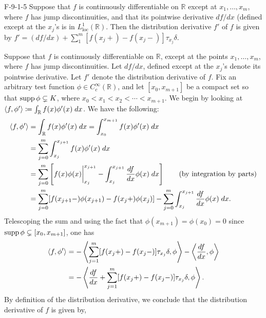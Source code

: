 \documentclass{article}
\begin{document}
	\begin{prb}{F-9-1-5}
		Suppose that $f$ is continuously differentiable on $\mathbb{R}$ except at $x_{1}, \ldots, x_{m}$, where $f$ has jump discontinuities, and that its pointwise derivative $df/dx$ (defined except at the $x_{j}$'s is in $L^{1}_{\text{loc}}(\mathbb{R})$. Then the distribution derivative $f'$ of $f$ is given by $f' = (df/dx) + \sum_{1}^{m}[f(x_{j}+) - f(x_{j}-)]\tau_{x_{j}}\delta$. 
	\end{prb}
	Suppose that $f$ is continuously differentiable on $\mathbb{R}$, except at the points $x_{1}, \ldots, x_{m}$, where $f$ has jump discontinuities. Let $df/dx$, defined except at the $x_{j}$'s denote its pointwise derivative. Let $f'$ denote the distribution derivative of $f$. Fix an arbitrary test function $\phi \in C_{c}^{\infty}(\mathbb{R})$, and let $[x_{0}, x_{m + 1}]$ be a compact set so that $\operatorname{supp}{\phi} \subsetneq K$, where $x_{0} < x_{1} < x_{2} < \dotsm < x_{m + 1}$. We begin by looking at $\braket{f, \phi'} \coloneqq \int_{\mathbb{R}}f(x)\phi'(x)\;dx$. We have the following: 
	\begin{align*}
		\begin{split}
			\braket{f, \phi'} &= \int_{\mathbb{R}}f(x)\phi'(x)\;dx = \int_{x_{0}}^{x_{m + 1}}f(x)\phi'(x)\;dx \\
			&= \sum_{j = 0}^{m}\int_{x_{j}}^{x_{j + 1}}f(x)\phi'(x)\;dx \\
			&= \sum_{j = 0}^{m}\left[f(x)\phi(x)\bigg|_{x_{j}}^{x_{j + 1}} - \int_{x_{j}}^{x_{j + 1}}\frac{df}{dx}\phi(x)\;dx\right] \qquad (\text{by integration by parts}) \\
			&= \sum_{j = 0}^{m}[f(x_{j+1}-)\phi(x_{j + 1}) - f(x_{j}+)\phi(x_{j})] - \sum_{j = 0}^{m}\int_{x_{j}}^{x_{j + 1}}\frac{df}{dx}\phi(x)\;dx. 
		\end{split}
	\end{align*}
	Telescoping the sum and using the fact that $\phi(x_{m + 1}) = \phi(x_{0}) = 0$ since $\operatorname{supp}{\phi} \subsetneq [x_{0}, x_{m + 1}]$, one has 
	\begin{align*}
		\begin{split}
			\braket{f, \phi'} &= -\left\langle\sum_{j = 1}^{m}[f(x_{j}+)-f(x_{j}-)]\tau_{x_{j}}\delta, \phi \right\rangle -\left\langle \frac{df}{dx}, \phi\right\rangle \\
			&= -\left\langle\frac{df}{dx} + \sum_{j = 1}^{m}[f(x_{j}+) - f(x_{j}-)]\tau_{x_{j}}\delta, \phi\right\rangle.  
		\end{split}
	\end{align*}
	By definition of the distribution derivative, we conclude that the distribution derivative of $f$ is given by, 
\end{document}
